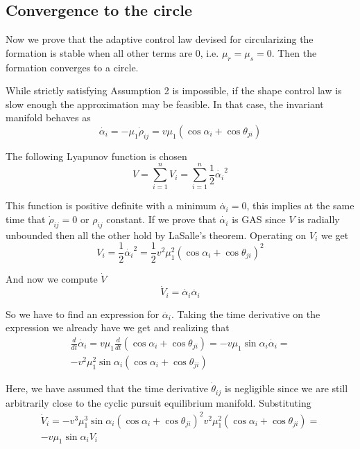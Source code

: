 \subsection{Convergence to the circle}
Now we prove that the adaptive control law devised for circularizing the formation is stable when all other terms are 0, i.e. $\mu_r=\mu_s=0$. Then the formation converges to a circle.

While strictly satisfying Assumption 2 is impossible, if the shape control law is slow enough the approximation may be feasible. In that case, the invariant manifold behaves as
\begin{equation*}
  \dot{\alpha_i} = -\mu_1 \dot{\rho}_{ij} = v \mu_1 (\cos \alpha_i + \cos \theta_{ji})
\end{equation*}

The following Lyapunov function \cite{khalil1996nonlinear} is chosen
\begin{equation*}
  V = \sum_{i=1}^{n} V_i = \sum_{i=1}^{n} \frac{1}{2} \dot{\alpha_i}^2
\end{equation*}

This function is positive definite with a minimum $\dot{\alpha_i}=0$, this implies at the same time that $\dot{\rho}_{ij}=0$ or $\rho_{ij}$ constant. If we prove that $\dot{\alpha_i}$ is GAS since $V$ is radially unbounded then all the other hold by LaSalle's theorem. Operating on $V_i$ we get 
\begin{equation*}
  V_i = \frac{1}{2} \dot{\alpha_i}^2 = \frac{1}{2} v^2 \mu_1^2 (\cos \alpha_i + \cos \theta_{ji})^2
\end{equation*}

And now we compute $\dot{V}$
\begin{equation*}
  \dot{V}_i = \dot{\alpha_i} \ddot{\alpha_i}
\end{equation*}

So we have to find an expression for $\ddot{\alpha_i}$. Taking the time derivative on the expression we already have we get and realizing that 
\begin{gather*}
  \frac{d}{dt} \dot{\alpha_i} = v \mu_1  \frac{d}{dt} (\cos \alpha_i + \cos \theta_{ji}) = - v \mu_1 \sin \alpha_i \dot{\alpha_i} = \\
  - v^2 \mu_1^2   \sin \alpha_i (\cos \alpha_i + \cos \theta_{ji})
\end{gather*}

Here, we have assumed that the time derivative  $\dot{\theta}_{ij}$ is negligible since we are still arbitrarily close to the cyclic pursuit equilibrium manifold. Substituting
\begin{gather*}
\dot{V}_i = - v^3 \mu_1^3 \sin \alpha_i (\cos \alpha_i + \cos \theta_{ji})^2  v^2 \mu_1^2    (\cos \alpha_i + \cos \theta_{ji}) =\\
- v \mu_1 \sin \alpha_i V_i
\end{gather*}

